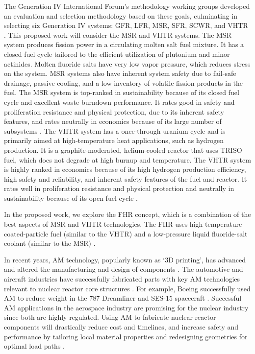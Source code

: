 The Generation IV International Forum's methodology working groups developed 
an evaluation and selection methodology based on these goals, 
culminating in selecting six Generation IV systems: \gls{GFR}, 
\gls{LFR}, \gls{MSR}, \gls{SFR}, \gls{SCWR}, and \gls{VHTR} 
\cite{gif_technology_2002}. 
This proposed work will consider the \gls{MSR} and \gls{VHTR} systems. 
The MSR system produces fission power in a circulating molten salt fuel mixture. 
It has a closed fuel cycle tailored to the efficient utilization of plutonium 
and minor actinides. 
Molten fluoride salts have very low vapor pressure, which reduces stress on the 
system. 
MSR systems also have inherent system safety due to fail-safe drainage, 
passive cooling, and a low inventory of volatile fission products in the fuel. 
The MSR system is top-ranked in sustainability because of its closed fuel cycle 
and excellent waste burndown performance. 
It rates good in safety and proliferation resistance and physical protection, 
due to its inherent safety features, and rates neutrally in economics because of
its large number of subsystems \cite{gif_technology_2002}.  
The \gls{VHTR} system has a once-through uranium cycle and is primarily aimed at 
high-temperature heat applications, such as hydrogen production. 
It is a graphite-moderated, helium-cooled reactor that uses \gls{TRISO} fuel, 
which does not degrade at high burnup and temperature.  
The \gls{VHTR} system is highly ranked in economics because of its high hydrogen 
production efficiency, high safety and reliability, and inherent safety features 
of the fuel and reactor. 
It rates well in proliferation resistance and physical protection and 
neutrally in sustainability because of its open fuel cycle \cite{gif_technology_2002}. 

In the proposed work, we explore the \gls{FHR} concept, which 
is a combination of the best aspects of \gls{MSR} and \gls{VHTR} technologies. 
The \gls{FHR} uses high-temperature coated-particle fuel (similar to the \gls{VHTR}) 
and a low-pressure liquid fluoride-salt coolant (similar to the \gls{MSR})
\cite{forsberg_fluoride-salt-cooled_2012,facilitators_fluoride-salt-cooled_2013}.

In recent years, \gls{AM} technology, popularly known as `3D printing', 
has advanced and altered the manufacturing and design of components 
\cite{simpson_considerations_2019}. 
The automotive and aircraft industries have successfully fabricated parts with 
key \gls{AM} technologies relevant to nuclear reactor core 
structures \cite{murr_frontiers_2016}.  
For example, Boeing successfully used \gls{AM} to reduce weight 
in the 787 Dreamliner \cite{noauthor_printed_2017} and SES-15 spacecraft 
\cite{noauthor_boeing_nodate}. 
Successful \gls{AM} applications in the aerospace industry are 
promising for the nuclear industry since both are highly regulated. 
Using \gls{AM} to fabricate nuclear reactor components will 
drastically reduce cost and timelines, and increase safety and performance by 
tailoring local material properties and redesigning geometries for optimal load paths 
\cite{simpson_considerations_2019}. 

